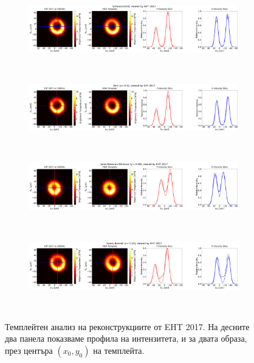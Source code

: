 \begin{figure}[h!]
	\centering
	\begin{subfigure}{12cm}
		\hspace{-1.5cm}
		\includegraphics[scale = 0.13]{Ehtim_Vida_plot_2017_230_Sch.png}
	\end{subfigure}\\
		\begin{subfigure}{12cm}
		\hspace{-1.5cm}
		\includegraphics[scale = 0.13]{Ehtim_Vida_plot_2017_230_Kerr.png}
	\end{subfigure}\\
	\begin{subfigure}{12cm}
		\hspace{-1.5cm}
		\includegraphics[scale = 0.13]{Ehtim_Vida_plot_2017_230_JNW.png}
	\end{subfigure}\\
	\begin{subfigure}{12cm}
		\hspace{-1.5cm}
		\includegraphics[scale = 0.13]{Ehtim_Vida_plot_2017_230_GB.png}
	\end{subfigure}\\
	\label{VIDA_EHT_ng2017}
	\caption[Темплейтен анализ на реконструкциите от EHT 2017]{Темплейтен анализ на реконструкциите от EHT 2017. На десните два панела показваме профила на интензитета, и за двата образа, през центъра $(x_0,y_0)$ на темплейта.} 
\end{figure}

